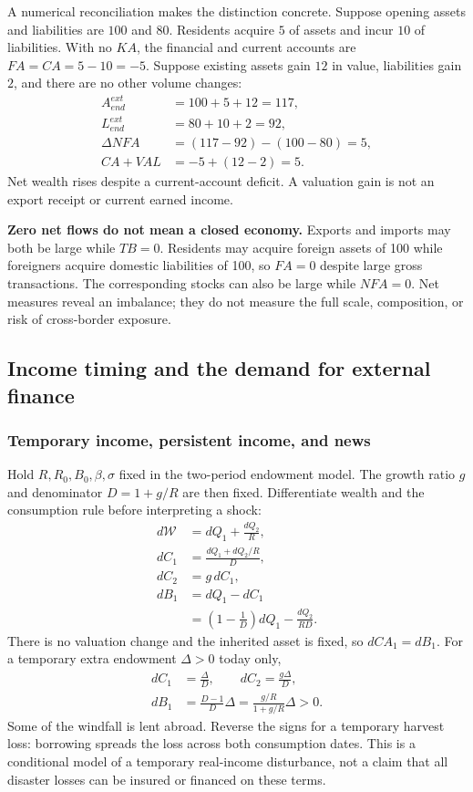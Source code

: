 A numerical reconciliation makes the distinction concrete. Suppose opening
assets and liabilities are $100$ and $80$. Residents acquire $5$ of assets
and incur $10$ of liabilities. With no $KA$, the financial and current
accounts are $FA=CA=5-10=-5$. Suppose existing assets gain $12$ in value,
liabilities gain $2$, and there are no other volume changes:
\begin{align}
 A^{ext}_{end}&=100+5+12=117,\\
 L^{ext}_{end}&=80+10+2=92,\\
 \Delta NFA&=(117-92)-(100-80)=5,\\
 CA+VAL&=-5+(12-2)=5.
\end{align}
Net wealth rises despite a current-account deficit. A valuation gain is not
an export receipt or current earned income.

\begin{blueblock}
\textbf{Zero net flows do not mean a closed economy.}
Exports and imports may both be large while $TB=0$. Residents may acquire
foreign assets of 100 while foreigners acquire domestic liabilities of 100,
so $FA=0$ despite large gross transactions. The corresponding stocks can
also be large while $NFA=0$. Net measures reveal an imbalance; they do not
measure the full scale, composition, or risk of cross-border exposure.
\end{blueblock}

\subsection{Income timing and the demand for external finance}

\subsubsection{Temporary income, persistent income, and news}

Hold $R,R_0,B_0,\beta,\sigma$ fixed in the two-period endowment model.
The growth ratio $g$ and denominator $D=1+g/R$ are then fixed. Differentiate
wealth and the consumption rule before interpreting a shock:
\begin{align}
 d\mathcal W&=dQ_1+\frac{dQ_2}{R},\\
 dC_1&=\frac{dQ_1+dQ_2/R}{D},\\
 dC_2&=g\,dC_1,\\
 dB_1&=dQ_1-dC_1\\
 &=\left(1-\frac1D\right)dQ_1-\frac{dQ_2}{RD}.\label{eq:open-income-response}
\end{align}
There is no valuation change and the inherited asset is fixed, so $dCA_1=dB_1$.
For a temporary extra endowment $\Delta>0$ today only,
\begin{align}
 dC_1&=\frac\Delta D,\qquad
 dC_2=\frac{g\Delta}{D},\\
 dB_1&=\frac{D-1}{D}\Delta
       =\frac{g/R}{1+g/R}\Delta>0.
\end{align}
Some of the windfall is lent abroad. Reverse the signs for a temporary
harvest loss: borrowing spreads the loss across both consumption dates.
This is a conditional model of a temporary real-income disturbance, not a
claim that all disaster losses can be insured or financed on these terms.


